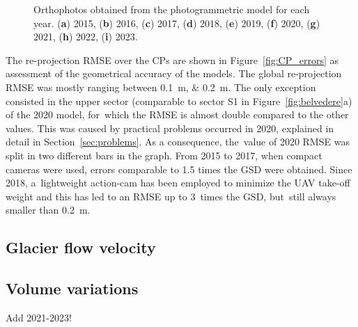 \begin{figure}
{    }
    \caption{Orthophotos obtained from the photogrammetric model for each year. (\textbf{a}) 2015, (\textbf{b}) 2016, (\textbf{c}) 2017, (\textbf{d}) 2018, (\textbf{e}) 2019, (\textbf{f}) 2020, (\textbf{g}) 2021, (\textbf{h}) 2022, (\textbf{i}) 2023.}
    \label{fig:ortophoto}
\end{figure}

The re-projection RMSE over the CPs are shown in Figure~\ref{fig:CP_errors} as assessment of the geometrical accuracy of the models. 
The global re-projection RMSE was mostly ranging between \SIlist{0.1;0.2}{\meter}.
The only exception consisted in the upper sector (comparable to sector S1 in Figure~\ref{fig:belvedere}a) of the 2020 model, for~which the RMSE is almost double compared to the other values. 
This was caused by practical problems occurred in 2020, explained in detail in Section~\ref{sec:problems}.
As a consequence, the~value of 2020 RMSE was split in two different bars in the graph.
From 2015 to 2017, when compact cameras were used, errors comparable to 1.5 times the GSD were obtained. 
Since 2018, a~lightweight action-cam has been employed to minimize the UAV take-off weight and this has led to an RMSE up to 3~times the GSD, but~still always smaller than \SI{0.2}{\meter}.


\subsection{Glacier flow velocity}

\subsection{Volume variations}

{\color{red} Add 2021-2023!}

